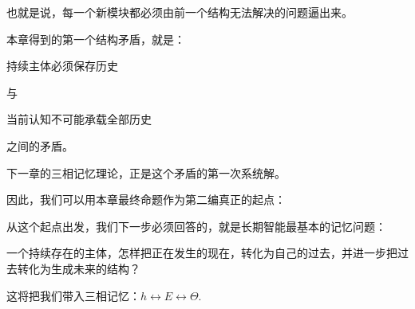也就是说，每一个新模块都必须由前一个结构无法解决的问题逼出来。

本章得到的第一个结构矛盾，就是：

\begin{statementbox}
持续主体必须保存历史
\end{statementbox}

与

\begin{statementbox}
当前认知不可能承载全部历史
\end{statementbox}

之间的矛盾。

下一章的三相记忆理论，正是这个矛盾的第一次系统解。

因此，我们可以用本章最终命题作为第二编真正的起点：

\begin{statementbox}
\centering
{}
\end{statementbox}

从这个起点出发，我们下一步必须回答的，就是长期智能最基本的记忆问题：

\begin{statementbox}
一个持续存在的主体，怎样把正在发生的现在，转化为自己的过去，并进一步把过去转化为生成未来的结构？
\end{statementbox}

这将把我们带入三相记忆：$h \leftrightarrow E \leftrightarrow \Theta$.
